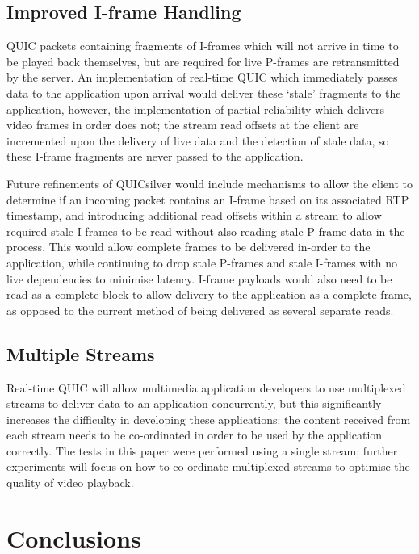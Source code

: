 \documentclass{mpaper}
\begin{document}
\subsection{Improved I-frame Handling}
QUIC packets containing fragments of I-frames which will not arrive in time to be played back themselves, but are required for live P-frames are retransmitted by the server. An implementation of real-time QUIC which immediately passes data to the application upon arrival would deliver these `stale' fragments to the application, however, the implementation of partial reliability which delivers video frames in order does not; the stream read offsets at the client are incremented upon the delivery of live data and the detection of stale data, so these I-frame fragments are never passed to the application.


Future refinements of QUICsilver would include mechanisms to allow the client to determine if an incoming packet contains an I-frame based on its associated RTP timestamp, and introducing additional read offsets within a stream to allow required stale I-frames to be read without also reading stale P-frame data in the process. This would allow complete frames to be delivered in-order to the application, while continuing to drop stale P-frames and stale I-frames with no live dependencies to minimise latency. I-frame payloads would also need to be read as a complete block to allow delivery to the application as a complete frame, as opposed to the current method of being delivered as several separate reads.


\subsection{Multiple Streams}
Real-time QUIC will allow multimedia application developers to use multiplexed streams to deliver data to an application concurrently, but this significantly increases the difficulty in developing these applications: the content received from each stream needs to be co-ordinated in order to be used by the application correctly. The tests in this paper were performed using a single stream; further experiments will focus on how to co-ordinate multiplexed streams to optimise the quality of video playback.

\section{Conclusions}
\end{document}
